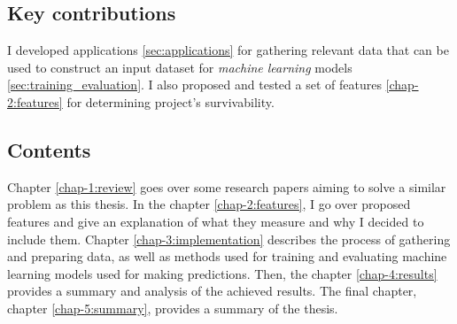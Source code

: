 \subsection*{Key contributions}

I developed applications \ref{sec:applications} for gathering relevant data that can be used to construct an input dataset for \emph{machine learning} models \ref{sec:training_evaluation}.
I also proposed and tested a set of features \ref{chap-2:features} for determining project's survivability.

\subsection*{Contents}

Chapter \ref{chap-1:review} goes over some research papers aiming to solve a similar problem as this thesis.
In the chapter \ref{chap-2:features}, I go over proposed features and give an explanation of what they measure and why I decided to include them.
Chapter \ref{chap-3:implementation} describes the process of gathering and preparing data, as well as methods used for training and evaluating machine learning models used for making predictions.
Then, the chapter \ref{chap-4:results} provides a summary and analysis of the achieved results.
The final chapter, chapter \ref{chap-5:summary}, provides a summary of the thesis.
